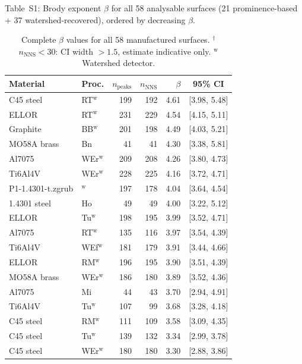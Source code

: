 \documentclass[final,3p,times,twocolumn]{elsarticle}
\theoremstyle{definition}
\begin{document}
Table~S1: Brody exponent $\beta$ for all 58 analysable surfaces
(21 prominence-based + 37 watershed-recovered), ordered by decreasing $\beta$.

\begin{table}[htbp]
  \centering
  \caption{Complete $\beta$ values for all 58 manufactured surfaces.
           $^{\dagger}$$n_{\text{NNS}}<30$: CI width $>1.5$, estimate indicative only.
           $^{\text{w}}$Watershed detector.}
  \label{tab:S1}
  \footnotesize
  \begin{tabular}{@{}llrrrc@{}}
    \toprule
    Material & Proc. & $n_{\text{peaks}}$ & $n_{\text{NNS}}$ & $\beta$ & 95\% CI \\
    \midrule
    C45 steel & RT$^{\text{w}}$ & 199 & 192 & 4.61 & [3.98, 5.48] \\
    ELLOR & RT$^{\text{w}}$ & 231 & 229 & 4.54 & [4.15, 5.11] \\
    Graphite & BB$^{\text{w}}$ & 201 & 198 & 4.49 & [4.03, 5.21] \\
    MO58A brass & Bn & 41 & 41 & 4.30 & [3.38, 5.81] \\
    Al7075 & WEr$^{\text{w}}$ & 209 & 208 & 4.26 & [3.80, 4.73] \\
    Ti6Al4V & WEr$^{\text{w}}$ & 228 & 225 & 4.16 & [3.72, 4.71] \\
    P1-1.4301-t.zgrub & $^{\text{w}}$ & 197 & 178 & 4.04 & [3.64, 4.54] \\
    1.4301 steel & Ho & 49 & 49 & 4.00 & [3.22, 5.12] \\
    ELLOR & Tu$^{\text{w}}$ & 198 & 195 & 3.99 & [3.52, 4.71] \\
    Al7075 & RT$^{\text{w}}$ & 135 & 116 & 3.97 & [3.54, 4.39] \\
    Ti6Al4V & WEf$^{\text{w}}$ & 181 & 179 & 3.91 & [3.44, 4.66] \\
    ELLOR & RM$^{\text{w}}$ & 196 & 195 & 3.90 & [3.51, 4.39] \\
    MO58A brass & WEr$^{\text{w}}$ & 186 & 180 & 3.89 & [3.52, 4.36] \\
    Al7075 & Mi & 44 & 43 & 3.70 & [2.94, 4.91] \\
    Ti6Al4V & Tu$^{\text{w}}$ & 107 & 99 & 3.68 & [3.28, 4.18] \\
    C45 steel & RM$^{\text{w}}$ & 111 & 109 & 3.58 & [3.09, 4.35] \\
    C45 steel & Tu$^{\text{w}}$ & 139 & 132 & 3.34 & [2.99, 3.78] \\
    C45 steel & WEr$^{\text{w}}$ & 180 & 180 & 3.30 & [2.88, 3.86] \\

\end{tabular}
\end{table}
\end{document}
